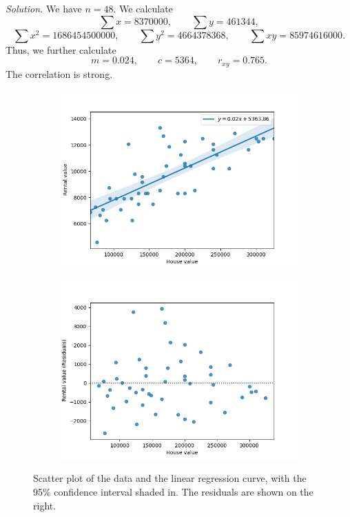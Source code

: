 \documentclass[10pt]{article}
\begin{document}
        \textit{Solution.} 
        We have $n = 48$. We calculate 
        \[
                \sum x = 8370000, \qquad \sum y = 461344,
        \]\[
                \sum x^2 = 1686454500000, \qquad \sum y^2 = 4664378368, \qquad \sum xy = 85974616000.
        \]
        Thus, we further calculate
        \[
                m = 0.024, \qquad c = 5364, \qquad r_{xy} = 0.765.
        \]
        The correlation is strong.
        \begin{figure}[H]
        \centering
        \begin{subfigure}[b]{0.49\textwidth}
                \includegraphics[width=\textwidth]{./10_2_1.png}
        \end{subfigure}
        \begin{subfigure}[b]{0.49\textwidth}
                \includegraphics[width=\textwidth]{./10_2_2.png}
        \end{subfigure}
        \caption{Scatter plot of the data and the linear regression curve, with the 95\% confidence interval shaded in.
        The residuals are shown on the right.}
        \label{fig:rental}
        \end{figure}
\end{document}
